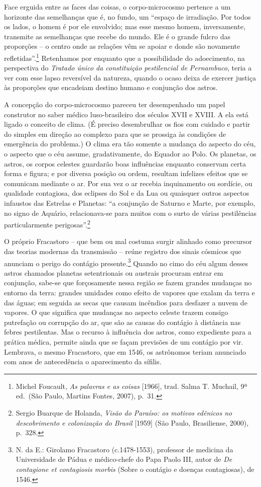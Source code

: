 Face erguida entre as faces das coisas, o corpo-microcosmo pertence a um
horizonte das semelhanças que é, no fundo, um ``espaço de irradiação.
Por todos os lados, o homem é por ele envolvido; mas esse mesmo homem,
inversamente, transmite as semelhanças que recebe do mundo. Ele é o
grande fulcro das proporções -- o centro onde as relações vêm se apoiar
e donde são novamente refletidas''.\footnote{Michel Foucault, \emph{As
  palavras e as coisas} {[}1966{]}, trad. Salma T. Muchail, 9ª ed.~(São
  Paulo, Martins Fontes, 2007), p.~31.} Retenhamos por enquanto que a
possibilidade do adoecimento, na perspectiva do \emph{Tratado único da
constituição pestilencial de Pernambuco}, teria a ver com esse lapso
reversível da natureza, quando o ocaso deixa de exercer justiça às
proporções que encadeiam destino humano e conjunção dos astros.

A concepção do corpo-microcosmo pareceu ter desempenhado um papel
construtor no saber médico luso-brasileiro dos séculos XVII e XVIII. A
ela está ligado o conceito de clima. (É preciso desembrulhar os fios com
cuidado e partir do simples em direção ao complexo para que se prossiga
às condições de emergência do problema.) O clima era tão somente a
mudança do aspecto do céu, o aspecto que o céu assume, gradativamente,
do Equador ao Polo. Os planetas, os astros, os corpos celestes guardarão
boas influências enquanto conservam certa forma e figura; e por diversa
posição ou ordem, resultam infelizes efeitos que se comunicam mediante o
ar. Por sua vez o ar recebia inquinamento ou sordície, ou qualidade
contagiosa, dos eclipses do Sol e da Lua ou quaisquer outros aspectos
infaustos das Estrelas e Planetas: ``a conjunção de Saturno e Marte, por
exemplo, no signo de Aquário, relacionava-se para muitos com o surto de
várias pestilências particularmente perigosas''.\footnote{Sergio Buarque
  de Holanda, \emph{Visão do Paraíso: os motivos edênicos no
  descobrimento e colonização do Brasil} {[}1959{]} (São Paulo,
  Brasiliense, 2000), p.~328.}

O próprio Fracastoro -- que bem ou mal costuma surgir alinhado como
precursor das teorias modernas da transmissão -- reúne registro dos
sinais cósmicos que anunciam o perigo do contágio presente.\footnote{N.
  da E.: Girolamo Fracastoro (c.1478-1553), professor de medicina da
  Universidade de Pádua e médico-chefe do Papa Paolo III, autor de
  \emph{De contagione et contagiosis morbis} (Sobre o contágio e doenças
  contagiosas), de 1546.} Quando no cimo do céu algum desses astros
chamados planetas setentrionais ou austrais procuram entrar em
conjunção, sabe-se que forçosamente nessa região se fazem grandes
mudanças no entorno da terra: grandes umidades como efeito de vapores
que exalam da terra e das águas; em seguida as secas que causam
incêndios para desfazer a nuvem de vapores. O que significa que mudanças
no aspecto celeste trazem consigo putrefação ou corrupção do ar, que são
as causas do contágio à distância nas febres pestilentas. Mas o recurso
à influência dos astros, como expediente para a prática médica, permite
ainda que se façam previsões de um contágio por vir. Lembrava, o mesmo
Fracastoro, que em 1546, os astrônomos teriam anunciado com anos de
antecedência o aparecimento da sífilis.

